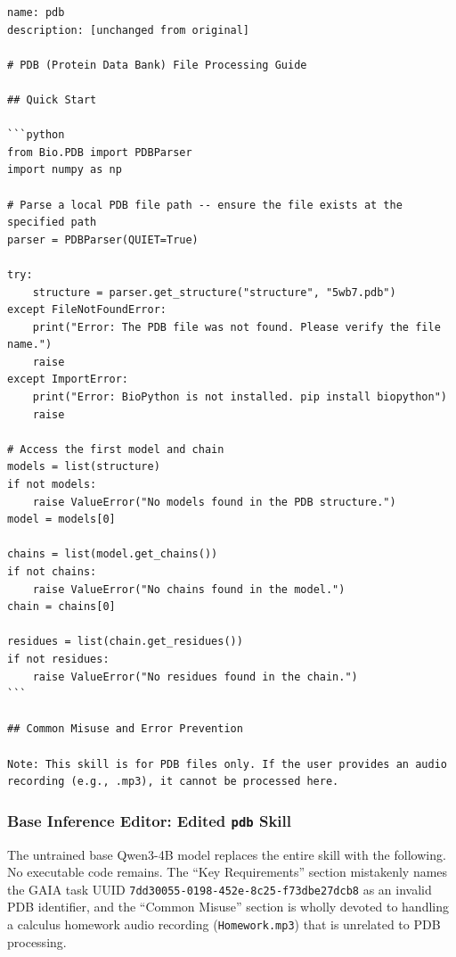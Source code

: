\begin{small}
\begin{verbatim}
name: pdb
description: [unchanged from original]

# PDB (Protein Data Bank) File Processing Guide

## Quick Start

```python
from Bio.PDB import PDBParser
import numpy as np

# Parse a local PDB file path -- ensure the file exists at the specified path
parser = PDBParser(QUIET=True)

try:
    structure = parser.get_structure("structure", "5wb7.pdb")
except FileNotFoundError:
    print("Error: The PDB file was not found. Please verify the file name.")
    raise
except ImportError:
    print("Error: BioPython is not installed. pip install biopython")
    raise

# Access the first model and chain
models = list(structure)
if not models:
    raise ValueError("No models found in the PDB structure.")
model = models[0]

chains = list(model.get_chains())
if not chains:
    raise ValueError("No chains found in the model.")
chain = chains[0]

residues = list(chain.get_residues())
if not residues:
    raise ValueError("No residues found in the chain.")
```

## Common Misuse and Error Prevention

Note: This skill is for PDB files only. If the user provides an audio
recording (e.g., .mp3), it cannot be processed here.
\end{verbatim}
\end{small}

\subsubsection{Base Inference Editor: Edited \texttt{pdb} Skill}

The untrained base Qwen3-4B model replaces the entire skill with the following. No executable code remains. The ``Key Requirements'' section mistakenly names the GAIA task UUID \texttt{7dd30055-0198-452e-8c25-f73dbe27dcb8} as an invalid PDB identifier, and the ``Common Misuse'' section is wholly devoted to handling a calculus homework audio recording (\texttt{Homework.mp3}) that is unrelated to PDB processing.

